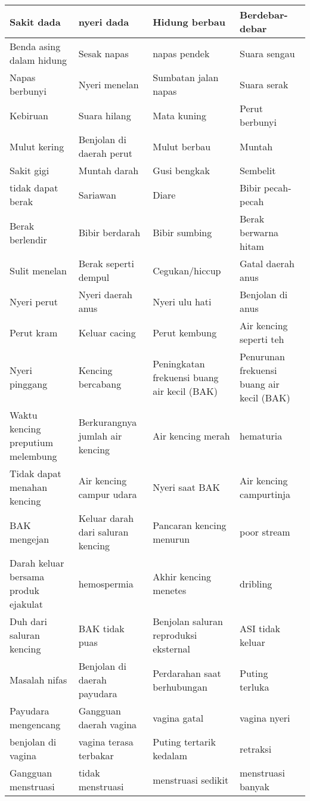 \begin{longtable}{|p{}|p{}|p{}|p{}|}
	Sakit dada & nyeri dada & Hidung berbau & Berdebar-debar \\ \hline
	Benda asing dalam hidung & Sesak napas & napas pendek & Suara sengau \\ \hline
	Napas berbunyi & Nyeri menelan & Sumbatan jalan napas & Suara serak \\ \hline
	Kebiruan & Suara hilang & Mata kuning & Perut berbunyi \\ \hline
	Mulut kering & Benjolan di daerah perut & Mulut berbau & Muntah \\ \hline
	Sakit gigi & Muntah darah & Gusi bengkak & Sembelit \\ \hline
	tidak dapat berak & Sariawan & Diare & Bibir pecah-pecah \\ \hline
	Berak berlendir & Bibir berdarah & Bibir sumbing & Berak berwarna hitam \\ \hline
	Sulit menelan & Berak seperti dempul & Cegukan/hiccup & Gatal daerah anus \\ \hline
	Nyeri perut & Nyeri daerah anus & Nyeri ulu hati & Benjolan di anus \\ \hline
	Perut kram & Keluar cacing & Perut kembung & Air kencing seperti teh \\ \hline
	Nyeri pinggang & Kencing bercabang & Peningkatan frekuensi buang air kecil (BAK) & Penurunan frekuensi buang air kecil (BAK) \\ \hline
	Waktu kencing preputium melembung & Berkurangnya jumlah air kencing & Air kencing merah & hematuria \\ \hline
	Tidak dapat menahan kencing & Air kencing campur udara & Nyeri saat BAK & Air kencing campurtinja \\ \hline
	BAK mengejan & Keluar darah dari saluran kencing & Pancaran kencing menurun & poor stream \\ \hline
	Darah keluar bersama produk ejakulat & hemospermia & Akhir kencing menetes & dribling \\ \hline
	Duh dari saluran kencing & BAK tidak puas & Benjolan saluran reproduksi eksternal & ASI tidak keluar \\ \hline
	Masalah nifas & Benjolan di daerah payudara & Perdarahan saat berhubungan & Puting terluka \\ \hline
	Payudara mengencang & Gangguan daerah vagina & vagina gatal & vagina nyeri \\ \hline
	benjolan di vagina & vagina terasa terbakar & Puting tertarik kedalam & retraksi \\ \hline
	Gangguan menstruasi & tidak menstruasi & menstruasi sedikit & menstruasi banyak \\ \hline

\end{longtable}
